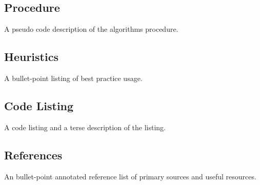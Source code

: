 \subsection{Procedure}
A pseudo code description of the algorithms procedure.

\subsection{Heuristics}
A bullet-point listing of best practice usage.

\subsection{Code Listing}
A code listing and a terse description of the listing.

\subsection{References}
An bullet-point annotated reference list of primary sources and useful resources.



